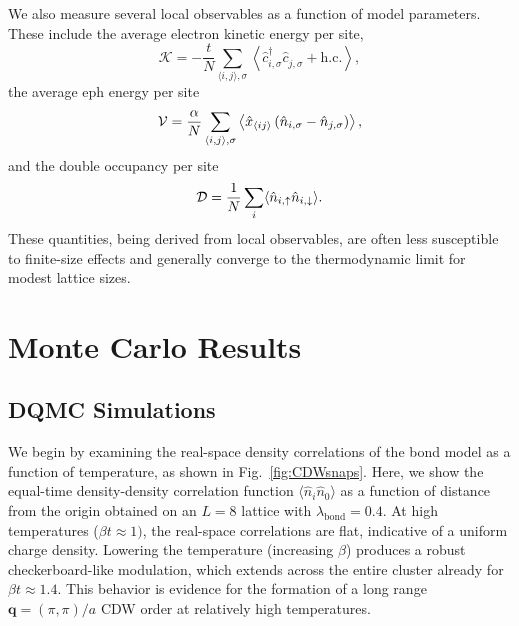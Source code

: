 \documentclass[%
reprint,
superscriptaddress,
nofootinbib,
twocolumn,
amsmath,amssymb,
aps,
prb,
]{revtex4-2}
\begin{document}
We also measure several local observables as a function of model parameters. These include the average electron kinetic energy per site,
\begin{equation}\label{eq:E_kin}
\mathcal{K} = -\frac{t}{N} \sum_{\langle i,j\rangle,\sigma}
\left\langle \hat{c}^\dagger_{i,\sigma}\hat{c}^{\phantom{\dagger}}_{j,\sigma} + \text{h.c.} \right\rangle,
\end{equation}
the average \gls*{eph} energy per site
\begin{equation}
{\cal V} = \frac{\alpha}{N} \sum_{\langle i,j \rangle,\sigma}
\left\langle \hat{x}_{\langle ij\rangle} \left( \hat{n}_{i,\sigma} -\hat{n}_{j,\sigma}\right) \right\rangle,
\end{equation}
and the double occupancy per site
\begin{equation}\label{eq:D}
{\cal D} = \frac{1}{N}\sum_i\langle \hat{n}_{i,\uparrow} \hat{n}_{i,\downarrow} \rangle.
\end{equation}
These quantities, being derived from local observables, are often less susceptible to finite-size effects and generally converge to the thermodynamic limit for modest lattice sizes.

\section{Monte Carlo Results}\label{sec:results}
\subsection{DQMC Simulations}\label{sec:results_DQMC}

We begin by examining the real-space density correlations of the bond model as a function of temperature, as shown in Fig.~\ref{fig:CDWsnaps}. Here, we show the equal-time density-density correlation function $\langle \hat{n}_i \hat{n}_0 \rangle$ as a function of distance from the origin obtained on an $L = 8$ lattice with $\lambda_\mathrm{bond} = 0.4$. At high temperatures ($\beta t \approx 1)$, the real-space correlations are flat, indicative of a uniform charge density. Lowering the temperature (increasing $\beta$) produces a robust checkerboard-like modulation, which extends across the entire cluster already for $\beta t \approx 1.4$. This behavior is evidence for the formation of a long range $\boldsymbol{q} = (\pi,\pi)/a$ \gls*{CDW} order at relatively high temperatures.
\end{document}
